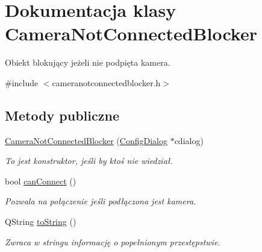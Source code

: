 \hypertarget{class_camera_not_connected_blocker}{
\section{Dokumentacja klasy CameraNotConnectedBlocker}
\label{class_camera_not_connected_blocker}
}


Obiekt blokujący jeżeli nie podpięta kamera.  




{\ttfamily \#include $<$cameranotconnectedblocker.h$>$}

\subsection*{Metody publiczne}
\begin{DoxyCompactItemize}
\item 
\hyperlink{class_camera_not_connected_blocker_a36847155966f5fded3d9d5ae9a348be7}{CameraNotConnectedBlocker} (\hyperlink{class_config_dialog}{ConfigDialog} $\ast$cdialog)
\begin{DoxyCompactList}\small\item\em To jest konstruktor, jeśli by ktoś nie wiedział. \item\end{DoxyCompactList}\item 
\hypertarget{class_camera_not_connected_blocker_a6a2b84c9469178c7bdc3a40279ba17eb}{
bool \hyperlink{class_camera_not_connected_blocker_a6a2b84c9469178c7bdc3a40279ba17eb}{canConnect} ()}
\label{class_camera_not_connected_blocker_a6a2b84c9469178c7bdc3a40279ba17eb}

\begin{DoxyCompactList}\small\item\em Pozwala na połączenie jeśli podłączona jest kamera. \item\end{DoxyCompactList}\item 
\hypertarget{class_camera_not_connected_blocker_adc130d65f47c9e7d2a07d032c3f62ba5}{
QString \hyperlink{class_camera_not_connected_blocker_adc130d65f47c9e7d2a07d032c3f62ba5}{toString} ()}
\label{class_camera_not_connected_blocker_adc130d65f47c9e7d2a07d032c3f62ba5}

\begin{DoxyCompactList}\small\item\em Zwraca w stringu informację o popełnionym przestępstwie. \item\end{DoxyCompactList}\end{DoxyCompactItemize}


